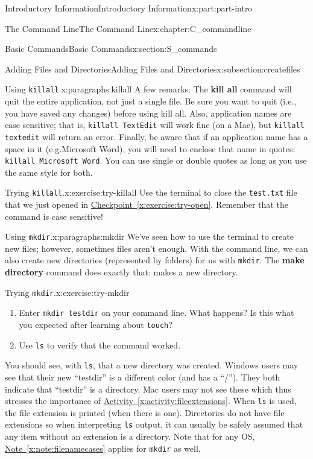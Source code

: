 \documentclass[oneside,10pt,]{book}
\newcommand{\xreffont}{\relax}
\newcommand{\mono}[1]{\texttt{#1}}
\newcommand{\terminology}[1]{\textbf{#1}}
\begin{document}
\begin{partptx}{Introductory Information}{}{Introductory Information}{}{}{x:part:part-intro}
\begin{chapterptx}{The Command Line}{}{The Command Line}{}{}{x:chapter:C_commandline}
\begin{sectionptx}{Basic Commands}{}{Basic Commands}{}{}{x:section:S_commands}
\begin{subsectionptx}{Adding Files and Directories}{}{Adding Files and Directories}{}{}{x:subsection:createfiles}
\begin{paragraphs}{Using \mono{killall}.}{x:paragraphs:killall}
A few remarks: The \terminology{kill all} command will quit the entire application, not just a single file. Be sure you want to quit (i.e., you have saved any changes) before using kill all. Also, application names are case sensitive; that is, \mono{killall TextEdit} will work fine (on a Mac), but \mono{killall textedit} will return an error. Finally, be aware that if an application name has a space in it (e.g.\@ Microsoft Word), you will need to enclose that name in quotes: \mono{killall \textquotesingle{}Microsoft Word\textquotesingle{}}. You can use single or double quotes as long as you use the same style for both.%
\begin{inlineexercise}{Trying \mono{killall}.}{x:exercise:try-killall}%
Use the terminal to close the \mono{test.txt} file that we just opened in \hyperref[x:exercise:try-open]{Checkpoint~{\xreffont\ref{x:exercise:try-open}}}. Remember that the command is case sensitive!%
\end{inlineexercise}%
\end{paragraphs}%
\begin{paragraphs}{Using \mono{mkdir}.}{x:paragraphs:mkdir}%
\index{\mono{mkdir}}%
%
\index{command line!\mono{mkdir}}%
We've seen how to use the terminal to create new files; however, sometimes files aren't enough. With the command line, we can also create new directories (represented by folders) for us with \mono{mkdir}. The \terminology{make directory} command does exactly that: makes a new directory.%
\begin{inlineexercise}{Trying \mono{mkdir}.}{x:exercise:try-mkdir}%
\begin{enumerate}[font=\bfseries,label=(\alph*),ref=\alph*]
\item{}Enter \mono{mkdir testdir} on your command line. What happens? Is this what you expected after learning about \mono{touch}?%
\item{}Use \mono{ls} to verify that the command worked.%
\end{enumerate}
\end{inlineexercise}%
You should see, with \mono{ls}, that a new directory was created. Windows users may see that their new ``testdir'' is a different color (and has a ``\slash{}''). They both indicate that ``testdir'' is a directory. Mac users may not see these which thus stresses the importance of \hyperref[x:activity:fileextensions]{Activity~{\xreffont\ref{x:activity:fileextensions}}}. When \mono{ls} is used, the file extension is printed (when there is one). Directories do not have file extensions so when interpreting \mono{ls} output, it can usually be safely assumed that any item without an extension is a directory. Note that for any OS, \hyperref[x:note:filenamecases]{Note~{\xreffont\ref{x:note:filenamecases}}} applies for \mono{mkdir} as well.%

\end{paragraphs}
\end{subsectionptx}
\end{sectionptx}
\end{chapterptx}
\end{partptx}
\end{document}
